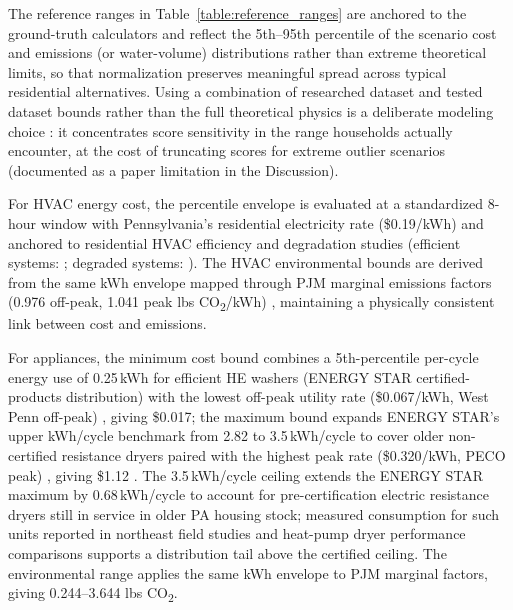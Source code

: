 \documentclass[final,3p,times]{elsarticle}
\begin{document}
The reference ranges in Table~\ref{table:reference_ranges} are anchored to the ground-truth calculators and reflect the 5th--95th percentile of the scenario cost and emissions (or water-volume) distributions rather than extreme theoretical limits, so that normalization preserves meaningful spread across typical residential alternatives. Using a combination of researched dataset and tested dataset bounds rather than the full theoretical physics is a deliberate modeling choice \cite{roszkowska2026}: it concentrates score sensitivity in the range households actually encounter, at the cost of truncating scores for extreme outlier scenarios (documented as a paper limitation in the Discussion).

For HVAC energy cost, the percentile envelope is evaluated at a standardized 8-hour window with Pennsylvania's residential electricity rate (\$0.19/kWh) \cite{eia2022,eia_epa_2024} and anchored to residential HVAC efficiency and degradation studies (efficient systems: \cite{synapse2013}; degraded systems: \cite{parker2018}). The HVAC environmental bounds are derived from the same kWh envelope mapped through PJM marginal emissions factors (0.976 off-peak, 1.041 peak lbs CO\textsubscript{2}/kWh) \cite{pjm2022emissions}, maintaining a physically consistent link between cost and emissions.

For appliances, the minimum cost bound combines a 5th-percentile per-cycle energy use of 0.25\,kWh for efficient HE washers (ENERGY STAR certified-products distribution) \cite{energystar_products} with the lowest off-peak utility rate (\$0.067/kWh, West Penn off-peak) \cite{peco2021}, giving \$0.017; the maximum bound expands ENERGY STAR's upper kWh/cycle benchmark from 2.82 to 3.5\,kWh/cycle to cover older non-certified resistance dryers paired with the highest peak rate (\$0.320/kWh, PECO peak) \cite{peco2021}, giving \$1.12 \cite{chenyu2018,hustvedt2013,winfield2016,neep2015,porras2020}. The 3.5\,kWh/cycle ceiling extends the ENERGY STAR maximum by 0.68\,kWh/cycle to account for pre-certification electric resistance dryers still in service in older PA housing stock; measured consumption for such units reported in northeast field studies \cite{neep2015} and heat-pump dryer performance comparisons \cite{winfield2016} supports a distribution tail above the certified ceiling. The environmental range applies the same kWh envelope to PJM marginal factors, giving 0.244--3.644 lbs CO\textsubscript{2}.
\end{document}
